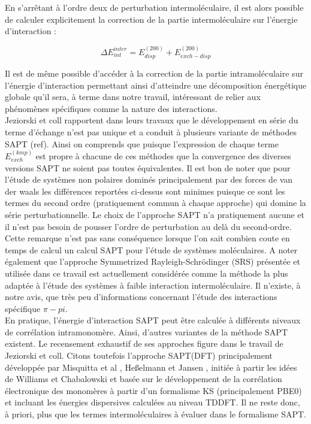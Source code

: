	En s’arrêtant à l’ordre deux de perturbation intermoléculaire, il est alors possible de calculer explicitement la correction de la partie intermoléculaire sur l’énergie d’interaction :
	
	\begin{equation}
	\Delta E_{int}^{inter} =  E_{disp}^{(200)} + E_{exch-disp}^{(200)}
	\end{equation}
	
	Il est de même possible d’accéder à la correction de la partie intramoléculaire sur l’énergie d’interaction permettant ainsi d’atteindre une décomposition énergétique globale qu’il sera, à terme dans notre travail, intéressant de relier aux phénomènes spécifiques comme la nature des interactions.\\
	
	Jeziorski et coll rapportent dans leurs travaux que le développement en série du terme d’échange n’est pas unique et a conduit à plusieurs variante de méthodes SAPT (ref). Ainsi on comprends que puisque l’expression de chaque terme $E_{exch}^{(kmp)}$ est propre à chacune de ces méthodes que la convergence des diverses versions SAPT ne soient pas toutes équivalentes. Il est bon de noter que pour l’étude de systèmes non polaires dominés principalement par des forces de van der waals les différences reportées ci-dessus sont minimes puisque ce sont les termes du second ordre (pratiquement commun à chaque approche) qui domine la série perturbationnelle. Le choix de l’approche SAPT n’a pratiquement aucune et il n’est pas besoin de pousser l’ordre de perturbation au delà du second-ordre. Cette remarque n’est pas sans conséquence lorsque l’on sait combien coute en temps de calcul un calcul SAPT pour l’étude de systèmes moléculaires. A noter également que l’approche Symmetrized Rayleigh-Schr\"{o}dinger (SRS) présentée et utilisée dans ce travail est actuellement considérée comme la méthode la plus adaptée à l’étude des systèmes à faible interaction intermoléculaire. Il n’existe, à notre avis, que très peu d’informations concernant l’étude des interactions spécifique $\pi-pi$.\\
	
	
	En pratique, l’énergie d'interaction SAPT peut être calculée à différents niveaux de corrélation intramonomère. Ainsi, d’autres variantes de la méthode SAPT existent.
	Le recensement exhaustif de ses approches figure dans le travail de Jeziorski et coll. Citons toutefois l’approche SAPT(DFT) principalement développée par 
	Misquitta et al \cite{misquitta2005intermolecular}, Heßelmann et Jansen \cite{hesselmann2002first}, initiée à partir les idées de Williams et Chabalowski \cite{williams2001using} et basée sur le développement de la corrélation électronique des monomères à partir d’un formalisme KS (principalement PBE0) et incluant les énergies dispersives calculées au niveau TDDFT. Il ne reste donc, à priori, plus que les termes intermoléculaires à évaluer dans le formalisme SAPT.\\
	
